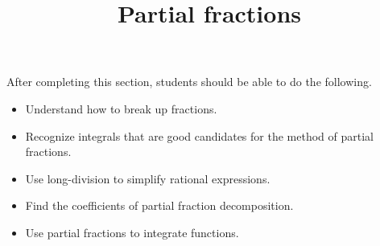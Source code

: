 \documentclass{ximera}
\title{Partial fractions}
\begin{document}
\begin{abstract}
\end{abstract}

\maketitle

\begin{sectionOutcomes}

After completing this section, students should be able to do the following.

\begin{itemize}
\item Understand how to break up fractions.
\item Recognize integrals that are good candidates for the method of partial fractions.
\item Use long-division to simplify rational expressions.
\item Find the coefficients of partial fraction decomposition.
\item Use partial fractions to integrate functions.
\end{itemize}

\end{sectionOutcomes}
\end{document}
